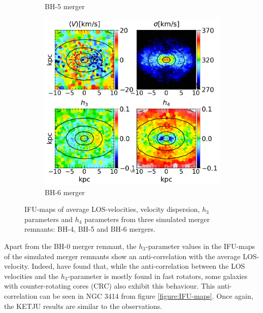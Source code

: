\documentclass[english, oneside]{HYgradu}
\begin{document}
\begin{figure}
\begin{subfigure}[b]{0.49\textwidth}
		\caption{BH-5 merger}
	\end{subfigure}
	\begin{subfigure}[b]{0.49\textwidth}
		\includegraphics[width=\textwidth]{BH_6.png}
		\caption{BH-6 merger}
	\end{subfigure}
	\caption{IFU-maps of average LOS-velocities, velocity dispersion, $h_3$ parameters and $h_4$ parameters from three simulated merger remnants: BH-4, BH-5 and BH-6 mergers.}
	\label{figure:all_voronoi_2}
\end{figure}


Apart from the BH-0 merger remnant, the $h_3$-parameter values in the IFU-maps of the simulated merger remnants show an anti-correlation with the average LOS-velocity. Indeed, \cite{Krajnovic2011} have found that, while the anti-correlation between the LOS velocities and the $h_3$-parameter is mostly found in fast rotators, some galaxies with counter-rotating cores (CRC) also exhibit this behaviour. This anti-correlation can be seen in NGC 3414 from figure \ref{figure:IFU-maps}. Once again, the KETJU results are similar to the observations.
\end{document}
